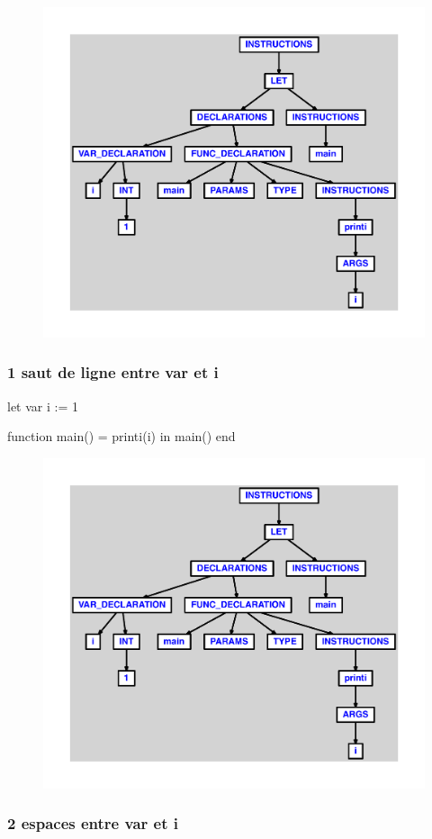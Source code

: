 \documentclass{article}
\begin{document}
\begin{figure}[H]\centering\includegraphics[max width=\textwidth]{ast/ast_333.pdf}\end{figure}\subsubsection{1 saut de ligne entre var et i}
\begin{verbatimtab}
let
	var
	i := 1

	function main() = printi(i)
in main() end
\end{verbatimtab}
\begin{figure}[H]\centering\includegraphics[max width=\textwidth]{ast/ast_334.pdf}\end{figure}\subsubsection{2 espaces entre var et i}
\end{document}
